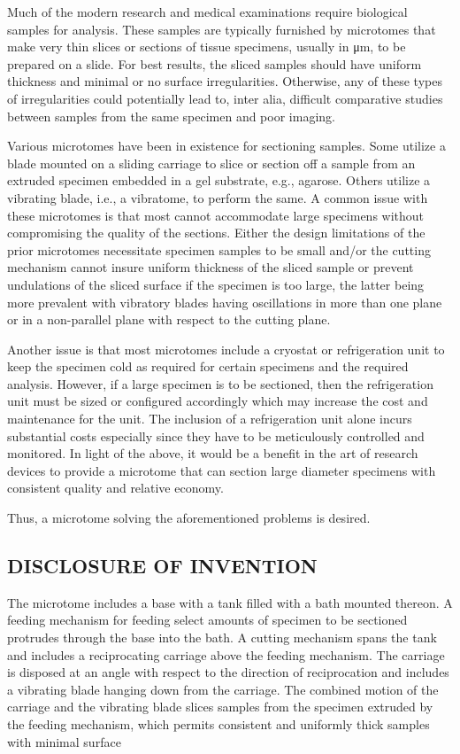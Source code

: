 \documentclass{article}
\begin{document}
Much of the modern research and medical examinations require biological samples for analysis. These samples are typically furnished by microtomes that make very thin slices or sections of tissue specimens, usually in μm, to be prepared on a slide. For best results, the sliced samples should have uniform thickness and minimal or no surface irregularities. Otherwise, any of these types of irregularities could potentially lead to, inter alia, difficult comparative studies between samples from the same specimen and poor imaging.

Various microtomes have been in existence for sectioning samples. Some utilize a blade mounted on a sliding carriage to slice or section off a sample from an extruded specimen embedded in a gel substrate, e.g., agarose. Others utilize a vibrating blade, i.e., a vibratome, to perform the same. A common issue with these microtomes is that most cannot accommodate large specimens without compromising the quality of the sections. Either the design limitations of the prior microtomes necessitate specimen samples to be small and/or the cutting mechanism cannot insure uniform thickness of the sliced sample or prevent undulations of the sliced surface if the specimen is too large, the latter being more prevalent with vibratory blades having oscillations in more than one plane or in a non-parallel plane with respect to the cutting plane.

Another issue is that most microtomes include a cryostat or refrigeration unit to keep the specimen cold as required for certain specimens and the required analysis. However, if a large specimen is to be sectioned, then the refrigeration unit must be sized or configured accordingly which may increase the cost and maintenance for the unit. The inclusion of a refrigeration unit alone incurs substantial costs especially since they have to be meticulously controlled and monitored. In light of the above, it would be a benefit in the art of research devices to provide a microtome that can section large diameter specimens with consistent quality and relative economy.

Thus, a microtome solving the aforementioned problems is desired.

\subsection*{DISCLOSURE OF INVENTION}

The microtome includes a base with a tank filled with a bath mounted thereon. A feeding mechanism for feeding select amounts of specimen to be sectioned protrudes through the base into the bath. A cutting mechanism spans the tank and includes a reciprocating carriage above the feeding mechanism. The carriage is disposed at an angle with respect to the direction of reciprocation and includes a vibrating blade hanging down from the carriage. The combined motion of the carriage and the vibrating blade slices samples from the specimen extruded by the feeding mechanism, which permits consistent and uniformly thick samples with minimal surface
\end{document}
